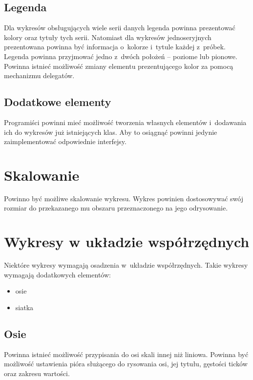 \subsection{Legenda}
Dla wykresów obsługujących wiele serii danych legenda powinna prezentować kolory oraz tytuły tych serii. Natomiast dla wykresów jednoseryjnych prezentowana powinna być informacja o~kolorze i~tytule każdej z~próbek. Legenda powinna przyjmować jedno z~dwóch położeń -- poziome lub pionowe. Powinna istnieć możliwość zmiany elementu prezentującego kolor za pomocą mechanizmu delegatów.

\subsection{Dodatkowe elementy}
Programiści powinni mieć możliwość tworzenia własnych elementów i~dodawania ich do wykresów już istniejących klas. Aby to osiągnąć powinni jedynie zaimplementować odpowiednie interfejsy.


\section{Skalowanie}
Powinno być możliwe skalowanie wykresu. Wykres powinien dostosowywać swój rozmiar do przekazanego mu obszaru przeznaczonego na jego odrysowanie.



\section{Wykresy w układzie współrzędnych}
Niektóre wykresy wymagają osadzenia w~układzie współrzędnych. Takie wykresy wymagają dodatkowych elementów:

\begin{itemize}
\item{osie}
\item{siatka}
\end{itemize}

\subsection{Osie}
Powinna istnieć możliwość przypisania do osi skali innej niż liniowa.
Powinna być możliwość ustawienia pióra służącego do rysowania osi, jej tytułu, gęstości ticków oraz zakresu wartości. 

